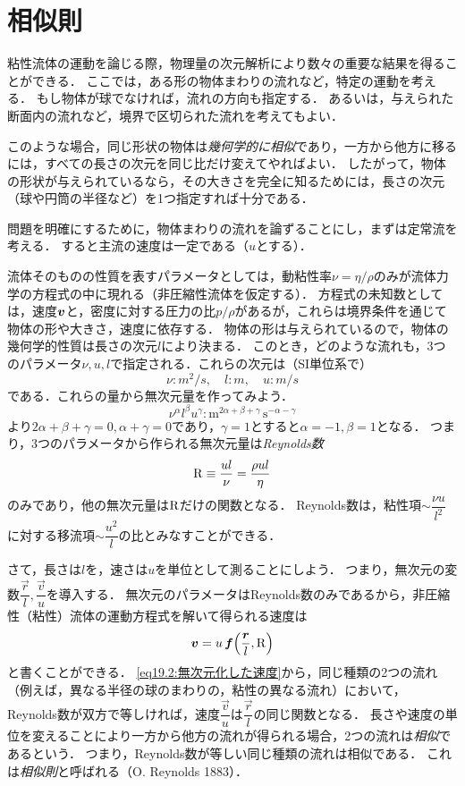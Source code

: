 \section{相似則}

粘性流体の運動を論じる際，物理量の次元解析により数々の重要な結果を得ることができる．
ここでは，ある形の物体まわりの流れなど，特定の運動を考える．
もし物体が球でなければ，流れの方向も指定する．
あるいは，与えられた断面内の流れなど，境界で区切られた流れを考えてもよい．


このような場合，同じ形状の物体は\emph{幾何学的に相似}であり，一方から他方に移るには，すべての長さの次元を同じ比だけ変えてやればよい．
したがって，物体の形状が与えられているなら，その大きさを完全に知るためには，長さの次元（球や円筒の半径など）を1つ指定すれば十分である．


問題を明確にするために，物体まわりの流れを論ずることにし，まずは定常流を考える．
すると主流の速度は一定である（$u$とする）．

流体そのものの性質を表すパラメータとしては，動粘性率$\nu=\eta/\rho$のみが流体力学の方程式の中に現れる（非圧縮性流体を仮定する）．
方程式の未知数としては，速度$\vb*{v}$と，密度に対する圧力の比$p/\rho$があるが，これらは境界条件を通じて物体の形や大きさ，速度に依存する．
物体の形は与えられているので，物体の幾何学的性質は長さの次元$l$により決まる．
このとき，どのような流れも，3つのパラメータ$\nu,u,l$で指定される．これらの次元は（SI単位系で）
\[
    \nu : \si{m^2/s} , \quad
    l : \si{m} , \quad
    u : \si{m/s}
\]
である．これらの量から無次元量を作ってみよう．
\[
    \nu^\alpha l^\beta u^\gamma : \mathrm{m}^{2\alpha+\beta+\gamma} \, \mathrm{s}^{-\alpha-\gamma}
\]
より$2\alpha+\beta+\gamma=0, \alpha+\gamma=0$であり，$\gamma=1$とすると$\alpha=-1, \beta=1$となる．
つまり，3つのパラメータから作られる無次元量は\emph{Reynolds数}
\begin{equation}\label{eq19.1:Reynolds数}
    \mathrm{R} \equiv \frac{ul}{\nu} = \frac{\rho ul}{\eta}
\end{equation}
のみであり，他の無次元量は$\mathrm{R}$だけの関数となる．
Reynolds数は，粘性項$\sim \dfrac{\nu u}{l^2}$に対する移流項$\sim \dfrac{u^2}{l}$の比とみなすことができる．



さて，長さは$l$を，速さは$u$を単位として測ることにしよう．
つまり，無次元の変数$\dfrac{\vec{r}}{l}, \dfrac{\vec{v}}{u}$を導入する．
無次元のパラメータはReynolds数のみであるから，非圧縮性（粘性）流体の運動方程式を解いて得られる速度は
\begin{equation}\label{eq19.2:無次元化した速度}
    \v = u\, \vec{f} \pqty{ \frac{\vec{r}}{l}, \R }
\end{equation}
と書くことができる．
\eqref{eq19.2:無次元化した速度}から，同じ種類の2つの流れ（例えば，異なる半径の球のまわりの，粘性の異なる流れ）において，
Reynolds数が双方で等しければ，速度$\dfrac{\vec{v}}{u}$は$\dfrac{\vec{r}}{l}$の同じ関数となる．
長さや速度の単位を変えることにより一方から他方の流れが得られる場合，2つの流れは\emph{相似}であるという．
つまり，Reynolds数が等しい同じ種類の流れは相似である．
これは\emph{相似則}と呼ばれる（O. Reynolds 1883）．


